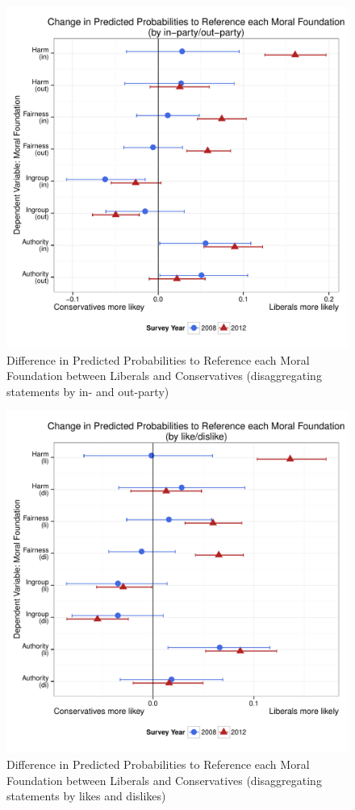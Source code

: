 \documentclass[12pt]{article}
\begin{document}
\begin{figure}\centering
\includegraphics[scale=.4]{../calc/fig/m1d_mft.pdf}
\caption{Difference in Predicted Probabilities to Reference each Moral Foundation between Liberals and Conservatives (disaggregating statements by in- and out-party)}\label{fig:m1d_mft}
\end{figure}

\begin{figure}\centering
\includegraphics[scale=.4]{../calc/fig/m1e_mft.pdf}
\caption{Difference in Predicted Probabilities to Reference each Moral Foundation between Liberals and Conservatives (disaggregating statements by likes and dislikes)}\label{fig:m1e_mft}
\end{figure}

\clearpage


\end{document}
